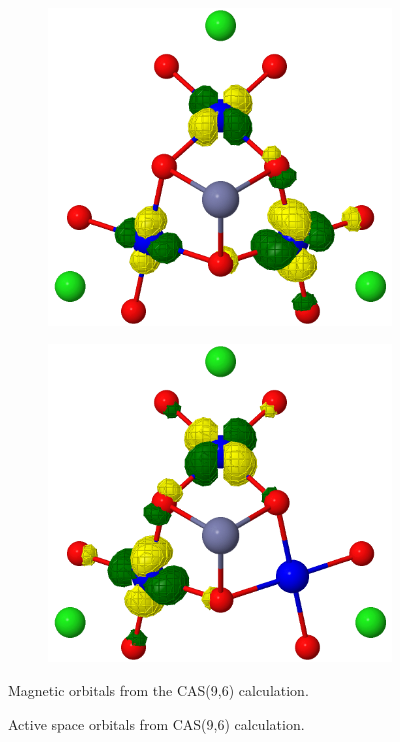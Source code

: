 \documentclass[12pt]{report}
\numberwithin{equation}{section}
\begin{document}
\begin{figure}
\begin{subfigure}{0.3\linewidth}
        \label{fig:subfigD}
     \end{subfigure}
\label{fig:subfigures}
\begin{subfigure}{0.3\linewidth}
    \includegraphics[width=\linewidth]{Images/mo5.trimer.png}
    \label{fig:subfigE}
 \end{subfigure}
\label{fig:subfigures}
\begin{subfigure}{0.3\linewidth}
    \includegraphics[width=\linewidth]{Images/mo6.trimer.png}
    \label{fig:subfigF}
 \end{subfigure}
\label{fig:OrbMag96}
\caption*{Magnetic orbitals from the CAS(9,6) calculation.}
\caption{Active space orbitals from CAS(9,6) calculation.}
\label{fig:PorbCAS96}
\end{figure}
\end{document}
